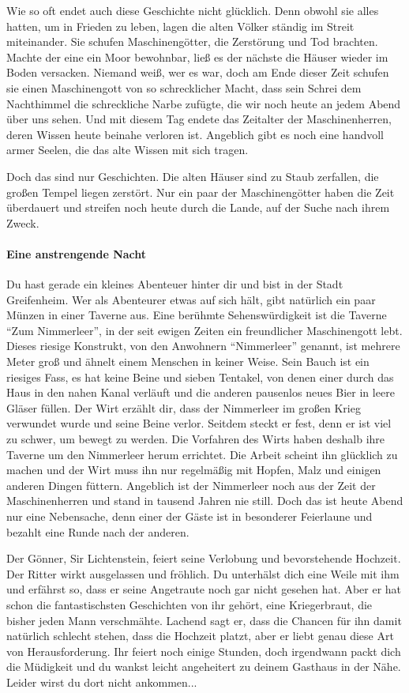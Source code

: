 Wie so oft endet auch diese Geschichte nicht glücklich. Denn obwohl sie alles hatten, um in Frieden zu leben, lagen die alten Völker ständig im Streit miteinander. Sie schufen Maschinengötter, die Zerstörung und Tod brachten. Machte der eine ein Moor bewohnbar, ließ es der nächste die Häuser wieder im Boden versacken. Niemand weiß, wer es war, doch am Ende dieser Zeit schufen sie einen Maschinengott von so schrecklicher Macht, dass sein Schrei dem Nachthimmel die schreckliche Narbe zufügte, die wir noch heute an jedem Abend über uns sehen. Und mit diesem Tag endete das Zeitalter der Maschinenherren, deren Wissen heute beinahe verloren ist. Angeblich gibt es noch eine handvoll armer Seelen, die das alte Wissen mit sich tragen.

Doch das sind nur Geschichten. Die alten Häuser sind zu Staub zerfallen, die großen Tempel liegen zerstört. Nur ein paar der Maschinengötter haben die Zeit überdauert und streifen noch heute durch die Lande, auf der Suche nach ihrem Zweck.

\paragraph{Eine anstrengende Nacht}

Du hast gerade ein kleines Abenteuer hinter dir und bist in der Stadt Greifenheim. Wer als Abenteurer etwas auf sich hält, gibt natürlich ein paar Münzen in einer Taverne aus. Eine berühmte Sehenswürdigkeit ist die Taverne ``Zum Nimmerleer'', in der seit ewigen Zeiten ein freundlicher Maschinengott lebt. Dieses riesige Konstrukt, von den Anwohnern ``Nimmerleer'' genannt, ist mehrere Meter groß und ähnelt einem Menschen in keiner Weise. Sein Bauch ist ein riesiges Fass, es hat keine Beine und sieben Tentakel, von denen einer durch das Haus in den nahen Kanal verläuft und die anderen pausenlos neues Bier in leere Gläser füllen.
Der Wirt erzählt dir, dass der Nimmerleer im großen Krieg verwundet wurde und seine Beine verlor. Seitdem steckt er fest, denn er ist viel zu schwer, um bewegt zu werden. Die Vorfahren des Wirts haben deshalb ihre Taverne um den Nimmerleer herum errichtet. Die Arbeit scheint ihn glücklich zu machen und der Wirt muss ihn nur regelmäßig mit Hopfen, Malz und einigen anderen Dingen füttern. Angeblich ist der Nimmerleer noch aus der Zeit der Maschinenherren und stand in tausend Jahren nie still. Doch das ist heute Abend nur eine Nebensache, denn einer der Gäste ist in besonderer Feierlaune und bezahlt eine Runde nach der anderen.

Der Gönner, Sir Lichtenstein, feiert seine Verlobung und bevorstehende Hochzeit. Der Ritter wirkt ausgelassen und fröhlich. Du unterhälst dich eine Weile mit ihm und erfährst so, dass er seine Angetraute noch gar nicht gesehen hat. Aber er hat schon die fantastischsten Geschichten von ihr gehört, eine Kriegerbraut, die bisher jeden Mann verschmähte. Lachend sagt er, dass die Chancen für ihn damit natürlich schlecht stehen, dass die Hochzeit platzt, aber er liebt genau diese Art von Herausforderung. Ihr feiert noch einige Stunden, doch irgendwann packt dich die Müdigkeit und du wankst leicht angeheitert zu deinem Gasthaus in der Nähe. Leider wirst du dort nicht ankommen...
